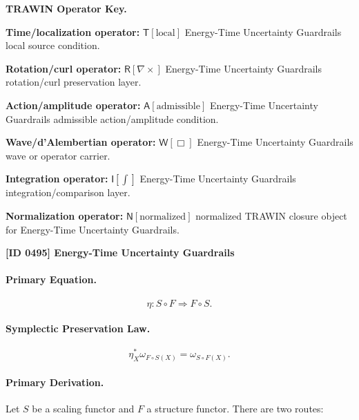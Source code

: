 \par\vspace{0.45\baselineskip}
\noindent\begin{minipage}[t]{\linewidth}
\begingroup
\small
\raggedright
\textbf{TRAWIN Operator Key.}\par
\noindent\textbf{Time/localization operator:} $\mathsf{T}\!\left[\mathrm{local}\right]$ Energy-Time Uncertainty Guardrails local source condition.\par
\noindent\textbf{Rotation/curl operator:} $\mathsf{R}\!\left[\nabla\times\right]$ Energy-Time Uncertainty Guardrails rotation/curl preservation layer.\par
\noindent\textbf{Action/amplitude operator:} $\mathsf{A}\!\left[\mathrm{admissible}\right]$ Energy-Time Uncertainty Guardrails admissible action/amplitude condition.\par
\noindent\textbf{Wave/d'Alembertian operator:} $\mathsf{W}\!\left[\Box\right]$ Energy-Time Uncertainty Guardrails wave or operator carrier.\par
\noindent\textbf{Integration operator:} $\mathsf{I}\!\left[\int\right]$ Energy-Time Uncertainty Guardrails integration/comparison layer.\par
\noindent\textbf{Normalization operator:} $\mathsf{N}\!\left[\mathrm{normalized}\right]$ normalized TRAWIN closure object for Energy-Time Uncertainty Guardrails.\par
\endgroup
\end{minipage}

\clearpage
\noindent\textbf{[ID 0495] Energy-Time Uncertainty Guardrails}\par
\vspace{0.35em}
\paragraph{Primary Equation.}
\begin{equation}
\eta:S\circ F\Rightarrow F\circ S.
\end{equation}

\paragraph{Symplectic Preservation Law.}
\begin{equation}
\eta_X^{*}\omega_{F\circ S(X)}
=
\omega_{S\circ F(X)}.
\end{equation}

\paragraph{Primary Derivation.}
Let $S$ be a scaling functor and $F$ a structure functor.  
There are two routes:

